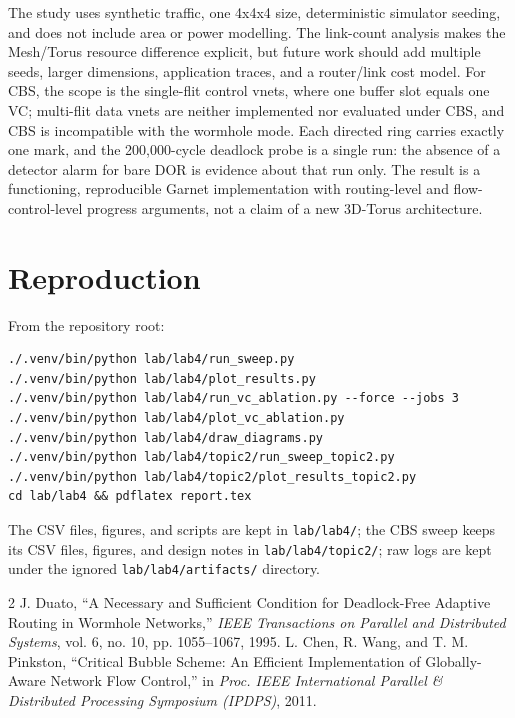 \documentclass[10pt]{article}
\begin{document}
The study uses synthetic traffic, one 4x4x4 size, deterministic simulator
seeding, and does not include area or power modelling. The link-count analysis
makes the Mesh/Torus resource difference explicit, but future work should add
multiple seeds, larger dimensions, application traces, and a router/link cost
model. For CBS, the scope is the single-flit control vnets, where one buffer
slot equals one VC; multi-flit data vnets are neither implemented nor
evaluated under CBS, and CBS is incompatible with the wormhole mode. Each
directed ring carries exactly one mark, and the 200,000-cycle deadlock probe
is a single run: the absence of a detector alarm for bare DOR is evidence
about that run only. The result is a functioning, reproducible Garnet
implementation with routing-level and flow-control-level progress arguments,
not a claim of a new 3D-Torus architecture.

\section{Reproduction}
From the repository root:
\begin{verbatim}
./.venv/bin/python lab/lab4/run_sweep.py
./.venv/bin/python lab/lab4/plot_results.py
./.venv/bin/python lab/lab4/run_vc_ablation.py --force --jobs 3
./.venv/bin/python lab/lab4/plot_vc_ablation.py
./.venv/bin/python lab/lab4/draw_diagrams.py
./.venv/bin/python lab/lab4/topic2/run_sweep_topic2.py
./.venv/bin/python lab/lab4/topic2/plot_results_topic2.py
cd lab/lab4 && pdflatex report.tex
\end{verbatim}
The CSV files, figures, and scripts are kept in \texttt{lab/lab4/}; the CBS
sweep keeps its CSV files, figures, and design notes in
\texttt{lab/lab4/topic2/}; raw logs are kept under the ignored
\texttt{lab/lab4/artifacts/} directory.

\begin{thebibliography}{2}
J. Duato, ``A Necessary and Sufficient Condition for Deadlock-Free Adaptive
Routing in Wormhole Networks,'' \emph{IEEE Transactions on Parallel and
Distributed Systems}, vol. 6, no. 10, pp. 1055--1067, 1995.
L. Chen, R. Wang, and T. M. Pinkston, ``Critical Bubble Scheme: An Efficient
Implementation of Globally-Aware Network Flow Control,'' in \emph{Proc. IEEE
International Parallel \& Distributed Processing Symposium (IPDPS)}, 2011.
\end{thebibliography}
\end{document}

